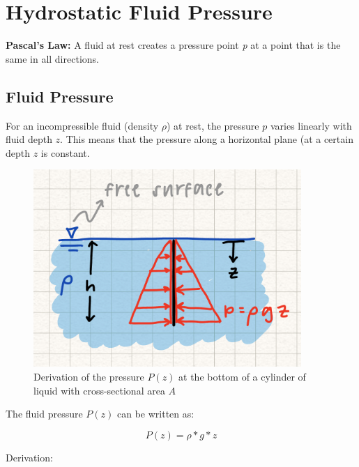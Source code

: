 \section{Hydrostatic Fluid Pressure}

\textbf{Pascal's Law:} A fluid at rest creates a pressure point \textit{p} at a point that is the same in all directions. 

\subsection{Fluid Pressure}

For an incompressible fluid (density $\rho$) at rest, the pressure $p$ varies linearly with fluid depth $z$. This means that the pressure along a horizontal plane (at a certain depth $z$ is constant.

\begin{figure}[!h]
\centering
\includegraphics[angle=0, width=4in]{FluidFigures/HydrostaticPressure.jpg}
\vspace{-2mm}
\caption{\small Derivation of the pressure $P(z)$ at the bottom of a cylinder of liquid with cross-sectional area $A$}
\vspace{-3mm}
\label{Fig:HydrostaticPressure}
\end{figure}

The fluid pressure $P(z)$ can be written as: 

\[P(z) = \rho*g*z\]

\noindent Derivation: 

